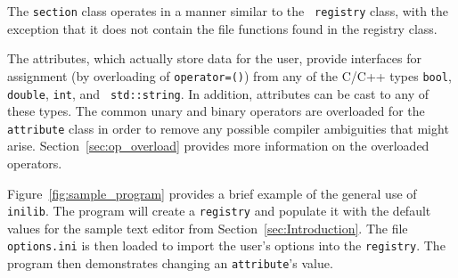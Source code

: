 The {\tt section} class operates in a manner similar to the {\tt
  registry} class, with the exception that it does not contain the
  file functions found in the registry class.

The attributes, which actually store data for the user, provide
interfaces for assignment (by overloading of {\tt operator=()}) from
any of the C/C++ types {\tt bool}, {\tt double}, {\tt int}, and {\tt
std::string}.  In addition, attributes can be cast to any of these
types.  The common unary and binary operators are overloaded for the
{\tt attribute} class in order to remove any possible compiler
ambiguities that might arise.  Section~\ref{sec:op_overload} provides
more information on the overloaded operators.

Figure~\ref{fig:sample_program} provides a brief example of the
general use of {\tt inilib}.  The program will create a {\tt registry}
and populate it with the default values for the sample text editor
from Section~\ref{sec:Introduction}.  The file {\tt options.ini} is
then loaded to import the user's options into the {\tt registry}.
The program then demonstrates changing an {\tt attribute}'s value.

